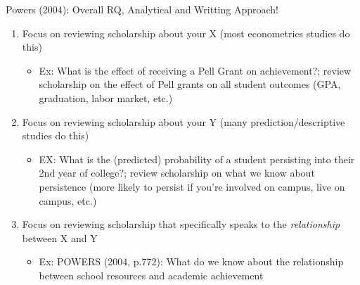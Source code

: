 \documentclass[
  8pt,
  ignorenonframetext,
  dvipsnames]{beamer}
\providecommand{\tightlist}{%
  \setlength{\itemsep}{0pt}\setlength{\parskip}{0pt}}
\let\olditem\item
\renewcommand{\item}{%
  \olditem\vspace{4pt}
}
\begin{document}
\begin{frame}{Powers (2004): Overall RQ, Analytical and Writting
Approach!}
\begin{itemize}
  \begin{enumerate}
  [(1)]
  \tightlist
  \item
    Focus on reviewing scholarship about your X (most econometrics
    studies do this)

    \begin{itemize}
    \tightlist
    \item
      Ex: What is the effect of receiving a Pell Grant on achievement?;
      review scholarship on the effect of Pell grants on all student
      outcomes (GPA, graduation, labor market, etc.)
    \end{itemize}
  \item
    Focus on reviewing scholarship about your Y (many
    prediction/descriptive studies do this)

    \begin{itemize}
    \tightlist
    \item
      EX: What is the (predicted) probability of a student persisting
      into their 2nd year of college?; review scholarship on what we
      know about persistence (more likely to persist if you're involved
      on campus, live on campus, etc.)
    \end{itemize}
  \item
    Focus on reviewing scholarship that specifically speaks to the
    \emph{relationship} between X and Y

    \begin{itemize}
    \tightlist
    \item
      Ex: POWERS (2004, p.772): What do we know about the relationship
      between school resources and academic achievement
    \end{itemize}
  \end{enumerate}
\end{itemize}

\end{frame}
\end{document}
